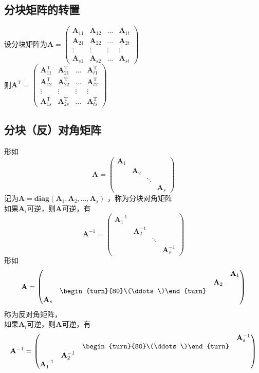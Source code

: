 \documentclass[a4paper]{ctexbook}
\begin{document}
\subsection{分块矩阵的转置}
设分块矩阵为\(\mathbf{A}=\begin{pmatrix}
    \mathbf{A}_{11}&\mathbf{A}_{12}&\dots&\mathbf{A}_{1t}
    \\\mathbf{A}_{21}&\mathbf{A}_{22}&\dots&\mathbf{A}_{2t}
    \\ \vdots &\vdots &\vdots &\vdots
    \\\mathbf{A}_{s1}&\mathbf{A}_{s2}&\dots&\mathbf{A}_{st}
\end{pmatrix}\)
\\则\(\mathbf{A}^\mathrm{T}=\begin{pmatrix}
    \mathbf{A}^\mathrm{T}_{11}&\mathbf{A}^\mathrm{T}_{21}&\dots&\mathbf{A}^\mathrm{T}_{t1}
    \\\mathbf{A}^\mathrm{T}_{12}&\mathbf{A}^\mathrm{T}_{22}&\dots&\mathbf{A}^\mathrm{T}_{t2}
    \\ \vdots &\vdots &\vdots &\vdots
    \\\mathbf{A}^\mathrm{T}_{1s}&\mathbf{A}^\mathrm{T}_{2s}&\dots&\mathbf{A}^\mathrm{T}_{ts}
\end{pmatrix}\)
\subsection{分块（反）对角矩阵}
形如\[\mathbf{A}=\begin{pmatrix}
    \mathbf{A}_1&
    \\ &\mathbf{A}_2
    \\ &&\ddots
    \\ &&&\mathbf{A}_s
\end{pmatrix}\]
记为\(\mathbf{A}= \mathbf{diag}(\mathbf{A}_{1},\mathbf{A}_{2},\dots ,\mathbf{A}_{s})\)
，称为分块对角矩阵
\\如果\(\mathbf{A}_{i}\)可逆，则\(\mathbf{A}\)可逆，有\[\mathbf{A}^{-1}=\begin{pmatrix}
    \mathbf{A}^{-1}_1&
    \\ &\mathbf{A}^{-1}_2
    \\ &&\ddots
    \\ &&&\mathbf{A}^{-1}_s
\end{pmatrix}\]
形如\[\mathbf{A}=\begin{pmatrix}
    &&&\mathbf{A}_1
    \\ &&\mathbf{A}_2
    \\ &\begin{turn}{80}\(\ddots\)\end{turn}
    \\ \mathbf{A}_s
\end{pmatrix}\]
称为反对角矩阵，
\\如果\(\mathbf{A}_{i}\)可逆，则\(\mathbf{A}\)可逆，有
\[\mathbf{A}^{-1}=\begin{pmatrix}
    &&&\mathbf{A}^{-1}_s
    \\ &&\begin{turn}{80}\(\ddots\)\end{turn}
    \\ &\mathbf{A}^{-1}_2
    \\ \mathbf{A}^{-1}_1
\end{pmatrix}\]
\end{document}
